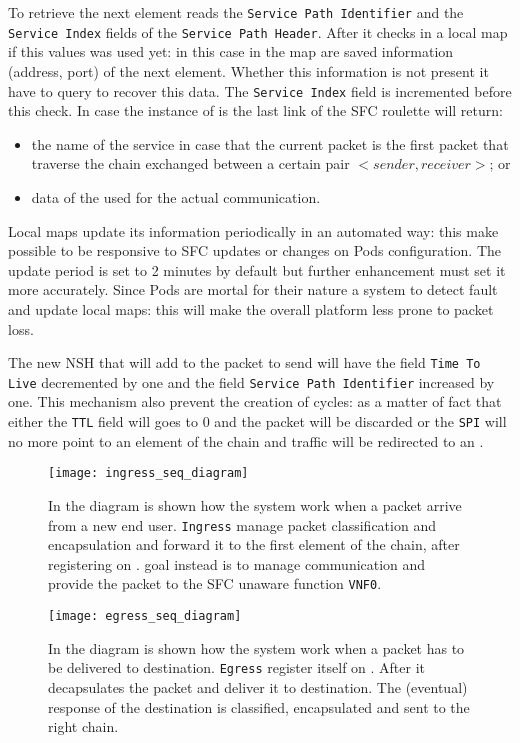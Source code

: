 To retrieve the next element \astaire{} reads the \texttt{Service Path
Identifier} and the \texttt{Service Index} fields of the \texttt{Service Path
Header}. After it checks in a local map if this values was used yet: in this
case in the map are saved information (address, port) of the next element.
Whether this information is not present it have to query \roulette{} to recover
this data. The \texttt{Service Index} field is incremented before this check. In
case the instance of \astaire{} is the last link of the SFC roulette will
return:
\begin{itemize}
  \item the name of the \egress{} service in case that the current packet is the
  first packet that traverse the chain exchanged between a certain pair
  $<sender,receiver>$; or
  \item data of the \egress{} used for the actual communication.
\end{itemize}
Local maps update its information periodically in an automated way: this make
possible to be responsive to SFC updates or changes on Pods configuration. The
update period is set to 2 minutes by default but further enhancement must set it
more accurately. Since Pods are mortal for their nature a system to detect fault
and update local maps: this will make the overall platform less prone to packet
loss.

The new NSH that \astaire{} will add to the packet to send will have the field
\texttt{Time To Live} decremented by one and the field \texttt{Service Path
Identifier} increased by one. This mechanism also prevent the creation of
cycles: as a matter of fact that either the \texttt{TTL} field will goes to $0$
and the packet will be discarded or the \texttt{SPI} will no more point to an
element of the chain and traffic will be redirected to an \egress{}.

\begin{figure}
  \centering \texttt{[image: ingress\_seq\_diagram]}
  \caption[Sequence diagram - Incoming traffic management]{In the diagram is
  shown how the system work when a packet arrive from a new end user. 
  \texttt{Ingress} manage packet classification and encapsulation and forward
  it to the first element of the chain, after registering on \roulette{}. 
  \astaire{} goal instead is to manage communication and provide the packet to
  the SFC unaware function \texttt{VNF0}.}
  \label{chap:impl:img:ingrdiagram}
\end{figure}

\begin{figure}
  \centering \texttt{[image: egress\_seq\_diagram]}
  \caption[Sequence diagram - Outgoing traffic management]{In the diagram is
  shown how the system work when a packet has to be delivered to destination.
  \texttt{Egress} register itself on \roulette{}. After it decapsulates the
  packet and deliver it to destination. The (eventual) response of the
  destination is classified, encapsulated and sent to the right chain.}
  \label{chap:impl:img:egrdiagram}
\end{figure}

